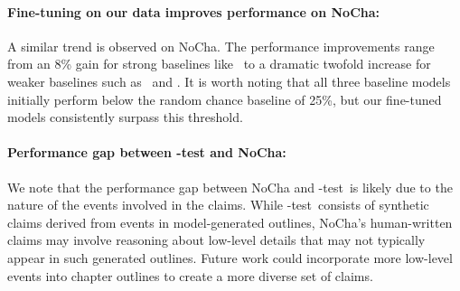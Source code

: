 \paragraph{Fine-tuning on our data improves performance on NoCha:} A similar trend is observed on NoCha. The performance improvements range from an 8\% gain for strong baselines like \qweninst\ to a dramatic twofold increase for weaker baselines such as \llamainst\ and \prolonginst. It is worth noting that all three baseline models initially perform below the random chance baseline of 25\%, but our fine-tuned models consistently surpass this threshold. 

\paragraph{Performance gap between \pipeline-test and NoCha:} We note that the performance gap between NoCha and \pipeline-test\ is likely due to the nature of the events involved in the claims. While \pipeline-test\ consists of synthetic claims derived from events in model-generated outlines, NoCha’s human-written claims may involve reasoning about low-level details that may not typically appear in such generated outlines. Future work could incorporate more low-level events into chapter outlines to create a more diverse set of claims.


